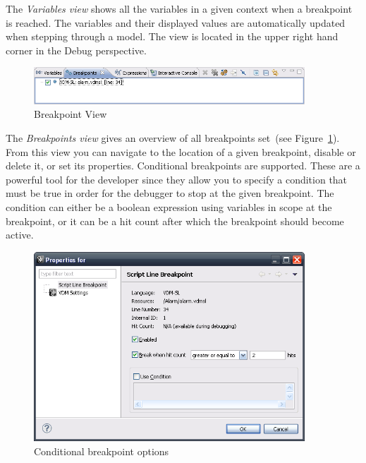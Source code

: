 {The \emph{Variables view} shows all the variables in a given context
when a breakpoint is reached. The variables and their displayed values
are automatically updated when stepping through a model. The view is
located in the upper right hand corner in the Debug perspective.


\begin{figure}[htp]
\begin{center}
  \caption{Breakpoint View}
  \label{fig:BreakpointView}
  \includegraphics[width=4in]{figures/BreakpointView}
\end{center}
\end{figure}

The \emph{Breakpoints view} gives an overview of all breakpoints
set~(see Figure~\ref{fig:BreakpointView}). From this view
you can navigate to the location of a given breakpoint, disable or
delete it, or set its properties.
Conditional breakpoints are supported. These are a powerful tool for
the developer since they allow you to specify a condition that must be
true in order for the debugger to stop at the given breakpoint. The
condition can either be a boolean expression using variables in scope
at the breakpoint, or it can be a hit count after which the breakpoint
should become active.

\begin{figure}[htp]
\begin{center}
  \caption{Conditional breakpoint options}
  \label{fig:BreakpointConditional}
  \includegraphics[width=4in]{figures/Breakpointconditional}
\end{center}
\end{figure}

}
